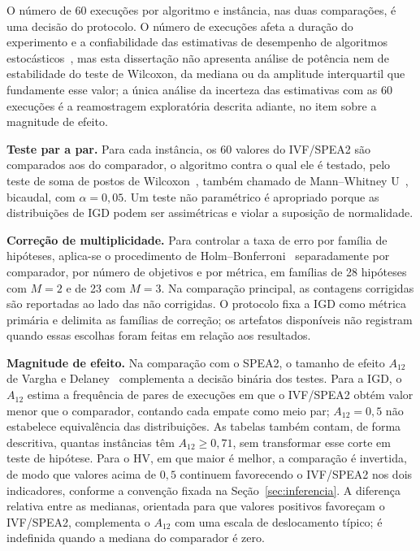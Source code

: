 O número de 60 execuções por algoritmo e instância, nas duas comparações, é uma decisão do protocolo. O número de execuções afeta a duração do experimento e a confiabilidade das estimativas de desempenho de algoritmos estocásticos~\cite{eftimov2025adaptive}, mas esta dissertação não apresenta análise de potência nem de estabilidade do teste de Wilcoxon, da mediana ou da amplitude interquartil que fundamente esse valor; a única análise da incerteza das estimativas com as 60 execuções é a reamostragem exploratória descrita adiante, no item sobre a magnitude de efeito.

\textbf{Teste par a par.} Para cada instância, os 60 valores do IVF/SPEA2 são comparados aos do comparador, o algoritmo contra o qual ele é testado, pelo teste de soma de postos de Wilcoxon~\cite{wilcoxon1945}, também chamado de Mann--Whitney U~\cite{mann1947test}, bicaudal, com $\alpha = 0{,}05$. Um teste não paramétrico é apropriado porque as distribuições de IGD podem ser assimétricas e violar a suposição de normalidade.

\textbf{Correção de multiplicidade.} Para controlar a taxa de erro por família de hipóteses, aplica-se o procedimento de Holm--Bonferroni~\cite{holm1979simple} separadamente por comparador, por número de objetivos e por métrica, em famílias de 28 hipóteses com $M = 2$ e de 23 com $M = 3$. Na comparação principal, as contagens corrigidas são reportadas ao lado das não corrigidas. O protocolo fixa a IGD como métrica primária e delimita as famílias de correção; os artefatos disponíveis não registram quando essas escolhas foram feitas em relação aos resultados.

\textbf{Magnitude de efeito.} Na comparação com o SPEA2, o tamanho de efeito $A_{12}$ de Vargha e Delaney~\cite{vargha2000critique} complementa a decisão binária dos testes. Para a IGD, o $A_{12}$ estima a frequência de pares de execuções em que o IVF/SPEA2 obtém valor menor que o comparador, contando cada empate como meio par; $A_{12} = 0{,}5$ não estabelece equivalência das distribuições. As tabelas também contam, de forma descritiva, quantas instâncias têm $A_{12}\geq 0{,}71$, sem transformar esse corte em teste de hipótese. Para o HV, em que maior é melhor, a comparação é invertida, de modo que valores acima de $0{,}5$ continuem favorecendo o IVF/SPEA2 nos dois indicadores, conforme a convenção fixada na Seção~\ref{sec:inferencia}. A diferença relativa entre as medianas, orientada para que valores positivos favoreçam o IVF/SPEA2, complementa o $A_{12}$ com uma escala de deslocamento típico; é indefinida quando a mediana do comparador é zero.

